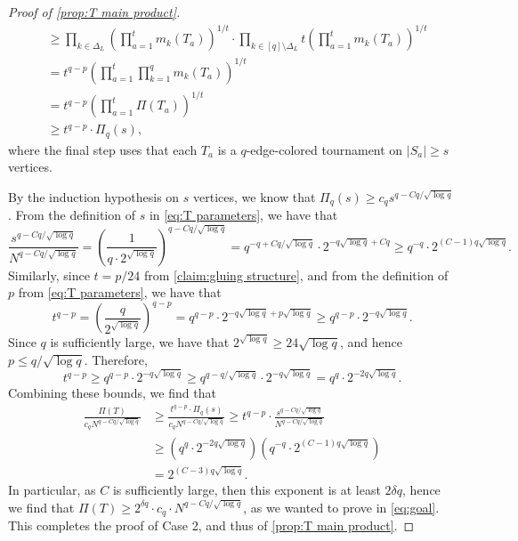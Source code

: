 \documentclass[10pt,a4paper]{amsart}
\newcommand\ab[1]{\lvert#1\rvert}
\begin{document}
\begin{proof}[Proof of \cref{prop:T main product}]
\begin{align*}
        &\geq \prod_{k\in \Delta_L} \left( \prod_{a=1}^t m_k(T_a) \right)^{1/t} \cdot \prod_{k\in [q]\setminus \Delta_L} t \left( \prod_{a=1}^t m_k(T_a) \right)^{1/t}\\
        &= t^{q-p} \left( \prod_{a=1}^t \prod_{k=1}^q m_k(T_a) \right)^{1/t}\\
        &=t^{q-p} \left( \prod_{a=1}^t \Pi(T_a) \right)^{1/t}\\
        &\geq t^{q-p}\cdot \Pi_q(s),
    \end{align*}
    where the final step uses that each $T_a$ is a $q$-edge-colored tournament on $\ab{S_a}\geq s$ vertices.

    By the induction hypothesis on $s$ vertices, we know that $\Pi_q(s) \geq c_q s^{q-Cq/\sqrt{\log q}}$. From the definition of $s$ in \eqref{eq:T parameters}, we have that
    \[
        \frac{s^{q-Cq/\sqrt{\log q}}}{N^{q-Cq/\sqrt{\log q}}} = \left( \frac{1}{q\cdot 2^{\sqrt{\log q}}} \right)^{q-Cq/\sqrt{\log q}} = q^{-q+Cq/\sqrt{\log q}} \cdot 2^{-q\sqrt{\log q}+Cq} \geq q^{-q} \cdot 2^{(C-1)q\sqrt{\log q}}.
    \]
    Similarly, since $t=p/24$ from \cref{claim:gluing structure}, and from the definition of $p$ from \eqref{eq:T parameters}, we have that
    \[
        t^{q-p} = \left( \frac{q}{2^{\sqrt{\log q}}} \right)^{q-p} =q^{q-p} \cdot 2^{-q \sqrt{\log q}+p\sqrt{\log q}} \geq q^{q-p} \cdot 2^{-q\sqrt{\log q}}.
    \]
    Since $q$ is sufficiently large, we have that $2^{\sqrt{\log q}}\geq 24\sqrt{\log q}$, and hence $p \leq q/\sqrt{\log q}$. Therefore,
    \[
        t^{q-p}\geq q^{q-p} \cdot 2^{-q\sqrt{\log q}} \geq q^{q-q/\sqrt{\log q}} \cdot 2^{-q\sqrt{\log q}}=q^q \cdot 2^{-2q\sqrt{\log q}}. 
    \]
    Combining these bounds, we find that
    \begin{align*}
        \frac{\Pi(T)}{c_q N^{q-Cq/\sqrt{\log q}}} &\geq \frac{t^{q-p}\cdot \Pi_q(s)}{c_q N^{q-Cq/\sqrt{\log q}}} \geq t^{q-p}\cdot \frac{s^{q-Cq/\sqrt{\log q}}}{N^{q-Cq/\sqrt{\log q}}}\\
        &\geq \left( q^q \cdot 2^{-2q \sqrt{\log q}} \right) \left( q^{-q} \cdot 2^{(C-1)q\sqrt{\log q}} \right)\\
        &= 2^{(C-3)q\sqrt{\log q}}. 
    \end{align*}
    In particular, as $C$ is sufficiently large, then this exponent is at least $2\delta q$, hence we find that $\Pi(T) \geq 2^{\delta q}\cdot c_q\cdot N^{q-Cq/\sqrt{\log q}}$, as we wanted to prove in \eqref{eq:goal}. This completes the proof of Case 2, and thus of \cref{prop:T main product}.
\end{proof}
\end{document}
